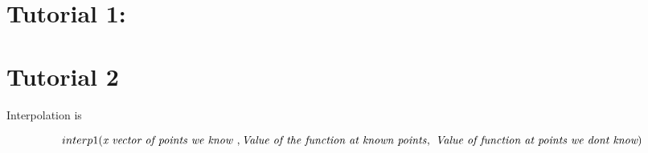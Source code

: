 \documentclass[11pt]{report}
\begin{document}
\begin{spacing}{1.5}
\chapter{Tutorial 1: }


\chapter{Tutorial 2}
Interpolation is 


\[ interp1( \text{\textit{x vector of points we know} },\\
 \text{\textit{Value of the function at known points}} , \\ 
 \textit{ Value of function at points we dont know}) \]
		
		
		
		

		
		
	\end{spacing}
\end{document}

